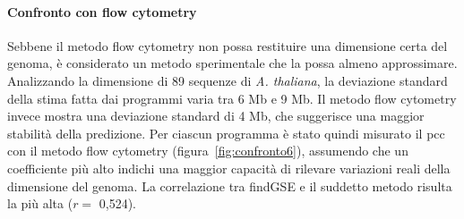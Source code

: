 \documentclass[crop=false, class=book]{standalone}
\begin{document}
	\paragraph{Confronto con flow cytometry}
	Sebbene il metodo flow cytometry non possa restituire una dimensione certa del genoma, è considerato un metodo sperimentale che la possa almeno approssimare. Analizzando la dimensione di 89 sequenze di \textit{A. thaliana}, la deviazione standard della stima fatta dai programmi varia tra 6 Mb e 9 Mb. Il metodo flow cytometry invece mostra una deviazione standard di 4 Mb, che suggerisce una maggior stabilità della predizione. Per ciascun programma è stato quindi misurato il \gls{pcc} con il metodo flow cytometry (figura~\vref{fig:confronto6}), assumendo che un coefficiente più alto indichi una maggior capacità di rilevare variazioni reali della dimensione del genoma. La correlazione tra findGSE e il suddetto metodo risulta la più alta ($r = $ 0,524). 
	
\end{document}
